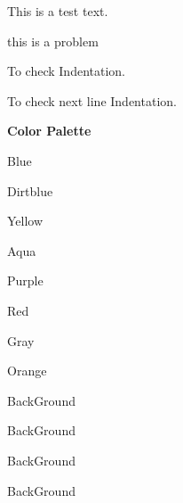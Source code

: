 \documentclass[11pt]{article}
\begin{document}
    This is a test text.


    \begin{problem*}
        this is a problem
    \end{problem*}

   To check Indentation.


   To check next line Indentation.


   \textbf{Color Palette} 

   {\color{G blue} Blue}

   {\color{G dirtblue} Dirtblue}
    
   {\color{G yellow} Yellow}

   {\color{G aqua} Aqua} 

   {\color{G purple} Purple}

   {\color{G red} Red}

   {\color{G gray} Gray}

   {\color{G orange} Orange}

   
   {\color{G bg} BackGround}

   {\color{G bg1} BackGround}

   {\color{G bg2} BackGround}

   {\color{G bg3} BackGround}
\end{document}
